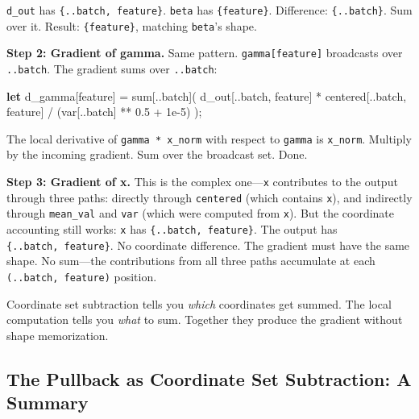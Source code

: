 \documentclass[11pt,titlepage]{article}
\newenvironment{Shaded}{}{}
\newcommand{\DecValTok}[1]{\textcolor[rgb]{0.25,0.63,0.44}{#1}}
\newcommand{\KeywordTok}[1]{\textcolor[rgb]{0.00,0.44,0.13}{\textbf{#1}}}
\newcommand{\NormalTok}[1]{#1}
\newcommand{\OperatorTok}[1]{\textcolor[rgb]{0.40,0.40,0.40}{#1}}
\begin{document}
\texttt{d\_out} has \texttt{\{..batch,\ feature\}}. \texttt{beta} has
\texttt{\{feature\}}. Difference: \texttt{\{..batch\}}. Sum over it.
Result: \texttt{\{feature\}}, matching \texttt{beta}'s shape.

\textbf{Step 2: Gradient of gamma.} Same pattern.
\texttt{gamma{[}feature{]}} broadcasts over \texttt{..batch}. The
gradient sums over \texttt{..batch}:

\begin{Shaded}
\begin{Highlighting}[]
\KeywordTok{let}\NormalTok{ d_gamma}\OperatorTok{[}\NormalTok{feature}\OperatorTok{]}\NormalTok{ = sum}\OperatorTok{[}\NormalTok{..batch}\OperatorTok{]}\NormalTok{(}
\NormalTok{    d_out}\OperatorTok{[}\NormalTok{..batch, feature}\OperatorTok{]}\NormalTok{ * centered}\OperatorTok{[}\NormalTok{..batch, feature}\OperatorTok{]}\NormalTok{ / (var}\OperatorTok{[}\NormalTok{..batch}\OperatorTok{]}\NormalTok{ ** }\DecValTok{0.5}\NormalTok{ + }\DecValTok{1}\NormalTok{e-}\DecValTok{5}\NormalTok{)}
\NormalTok{);}
\end{Highlighting}
\end{Shaded}

The local derivative of \texttt{gamma\ *\ x\_norm} with respect to
\texttt{gamma} is \texttt{x\_norm}. Multiply by the incoming gradient.
Sum over the broadcast set. Done.

\textbf{Step 3: Gradient of x.} This is the complex one---\texttt{x}
contributes to the output through three paths: directly through
\texttt{centered} (which contains \texttt{x}), and indirectly through
\texttt{mean\_val} and \texttt{var} (which were computed from
\texttt{x}). But the coordinate accounting still works: \texttt{x} has
\texttt{\{..batch,\ feature\}}. The output has
\texttt{\{..batch,\ feature\}}. No coordinate difference. The gradient
must have the same shape. No sum---the contributions from all three
paths accumulate at each \texttt{(..batch,\ feature)} position.

Coordinate set subtraction tells you \emph{which} coordinates get
summed. The local computation tells you \emph{what} to sum. Together
they produce the gradient without shape memorization.

\vspace{2em}

\hypertarget{the-pullback-as-coordinate-set-subtraction-a-summary}{%
\subsection{The Pullback as Coordinate Set Subtraction: A
Summary}\label{the-pullback-as-coordinate-set-subtraction-a-summary}}
\end{document}
